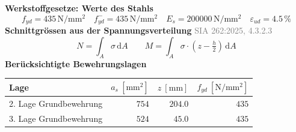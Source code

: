 \documentclass[11pt,a4paper]{article}
\newcommand{\normref}[1]{{\small\textcolor{gray}{#1}}}
\begin{document}
\noindent\textbf{Werkstoffgesetze: Werte des Stahls}
\begin{equation*}
f_{yd} = 435\,\mathrm{N}/\mathrm{mm}^{2} \quad f_{yd}^{-} = 435\,\mathrm{N}/\mathrm{mm}^{2} \quad E_s = 200000\,\mathrm{N}/\mathrm{mm}^{2} \quad \varepsilon_{ud} = 4.5\,\%
\end{equation*}
\noindent\textbf{Schnittgrössen aus der Spannungsverteilung} \hfill \normref{SIA 262:2025, 4.3.2.3}
\begin{equation*}
N = \int_A \sigma\,\mathrm{d}A \qquad M = \int_A \sigma \cdot \left(z - \tfrac{h}{2}\right)\,\mathrm{d}A
\end{equation*}
\noindent\textbf{Berücksichtigte Bewehrungslagen}
\begin{longtable}{lrrr}
\hline
Lage & $a_s\ [\mathrm{mm}^2]$ & $z\ [\mathrm{mm}]$ & $f_{yd}\ [\mathrm{N/mm^2}]$ \\
\hline
\endhead
2. Lage Grundbewehrung & $754$ & $204.0$ & $435$ \\
3. Lage Grundbewehrung & $524$ & $45.0$ & $435$ \\
\hline
\end{longtable}
\end{document}
